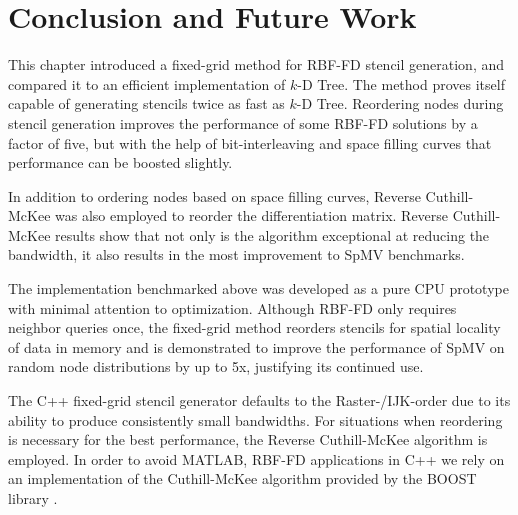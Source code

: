 \documentclass{report}
\begin{document}


\section{Conclusion and Future Work}

This chapter introduced a fixed-grid method for RBF-FD stencil generation, and compared it to an efficient implementation of $k$-D Tree. The method proves itself capable of generating stencils twice as fast as $k$-D Tree.  
Reordering nodes during stencil generation improves the performance of some RBF-FD solutions by a factor of five, but with the help of bit-interleaving and space filling curves that performance can be boosted slightly.

In addition to ordering nodes based on space filling curves, Reverse Cuthill-McKee was also employed to reorder the differentiation matrix. Reverse Cuthill-McKee results show that not only is the algorithm exceptional at reducing the bandwidth, it also results in the most improvement to SpMV benchmarks. 

The implementation benchmarked above was developed as a pure CPU prototype with minimal attention to optimization. Although RBF-FD only requires neighbor queries once, the fixed-grid method reorders  stencils for spatial locality of data in memory and is demonstrated to improve the performance of SpMV on random node distributions by up to 5x, justifying its continued use. 

The C++ fixed-grid stencil generator defaults to the Raster-/IJK-order due to its ability to produce consistently small bandwidths. For situations when reordering is necessary for the best performance, the Reverse Cuthill-McKee algorithm is employed. In order to avoid MATLAB, RBF-FD applications in C++ we rely on an implementation of the Cuthill-McKee algorithm provided by the BOOST library \cite{BoostSite}. 


\end{document}
